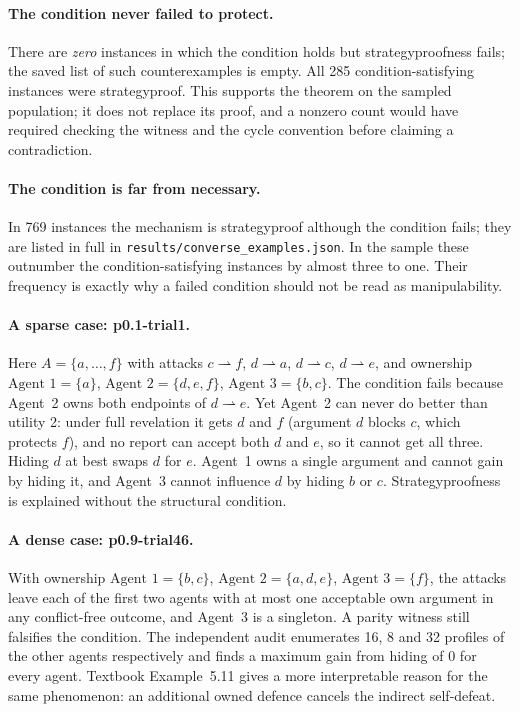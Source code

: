 \documentclass[11pt,a4paper]{article}
\newcommand{\attacks}{\rightharpoonup}
\newcommand{\file}[1]{\texttt{#1}}
\begin{document}
\paragraph{The condition never failed to protect.}
There are \emph{zero} instances in which the condition holds but strategyproofness fails; the saved list of such counterexamples is empty. All 285 condition-satisfying instances were strategyproof. This supports the theorem on the sampled population; it does not replace its proof, and a nonzero count would have required checking the witness and the cycle convention before claiming a contradiction.

\paragraph{The condition is far from necessary.}
In 769 instances the mechanism is strategyproof although the condition fails; they are listed in full in \file{results/converse\_examples.json}. In the sample these outnumber the condition-satisfying instances by almost three to one. Their frequency is exactly why a failed condition should not be read as manipulability.

\paragraph{A sparse case: p0.1-trial1.}
Here $A=\{a,\dots,f\}$ with attacks $c\attacks f$, $d\attacks a$, $d\attacks c$, $d\attacks e$, and ownership $\text{Agent 1}=\{a\}$, $\text{Agent 2}=\{d,e,f\}$, $\text{Agent 3}=\{b,c\}$. The condition fails because Agent~2 owns both endpoints of $d\attacks e$. Yet Agent~2 can never do better than utility 2: under full revelation it gets $d$ and $f$ (argument $d$ blocks $c$, which protects $f$), and no report can accept both $d$ and $e$, so it cannot get all three. Hiding $d$ at best swaps $d$ for $e$. Agent~1 owns a single argument and cannot gain by hiding it, and Agent~3 cannot influence $d$ by hiding $b$ or $c$. Strategyproofness is explained without the structural condition.

\paragraph{A dense case: p0.9-trial46.}
With ownership $\text{Agent 1}=\{b,c\}$, $\text{Agent 2}=\{a,d,e\}$, $\text{Agent 3}=\{f\}$, the attacks leave each of the first two agents with at most one acceptable own argument in any conflict-free outcome, and Agent~3 is a singleton. A parity witness still falsifies the condition. The independent audit enumerates 16, 8 and 32 profiles of the other agents respectively and finds a maximum gain from hiding of 0 for every agent. Textbook Example~5.11 gives a more interpretable reason for the same phenomenon: an additional owned defence cancels the indirect self-defeat.
\end{document}
